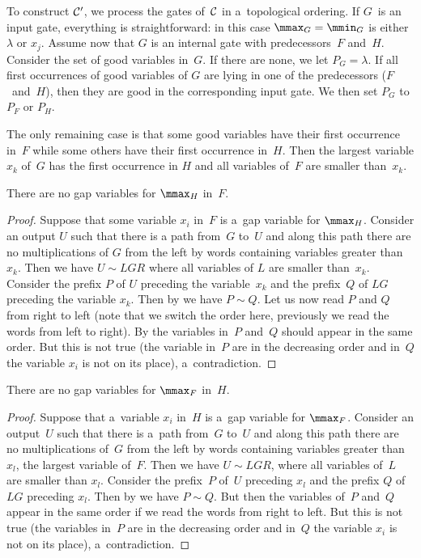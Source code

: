\documentclass{toc}
\begin{document}
To construct ${\cal C}'$, we process the gates of~${\cal C}$ in a~topological ordering. If $G$~is an input gate, everything is straightforward: in this case $\mmax_G=\mmin_G$ is either $\lambda$ or $x_j$. Assume now that $G$ is an internal gate with predecessors~$F$ and~$H$.
Consider the set of good variables in~$G$. If there are none, we let $P_G=\lambda$. If all first occurrences of good variables of $G$ are lying in one of the predecessors ($F$~and~$H$), then they are good in the corresponding input gate. We then set $P_G$ to $P_F$ or $P_H$.

The only remaining case is that some good variables have their first occurrence in~$F$ while some others have their first occurrence in~$H$. Then the largest variable $x_k$ of~$G$ has the first occurrence in $H$ and all variables of~$F$ are smaller than~$x_k$.

\begin{claim} \label{cl: h is good}
    There are no gap variables for $\mmax_H$ in~$F$.
\end{claim}

\begin{proof}
    Suppose that some variable $x_i$ in~$F$ is a~gap variable for $\mmax_H$. Consider an output $U$ such that there is a path from~$G$ to~$U$ and along this path there are no multiplications of $G$ from the left by words containing variables greater than~$x_k$. Then we have $U \sim LGR$ where all variables of $L$ are smaller than~$x_k$. Consider the prefix $P$ of $U$ preceding the variable~$x_k$ and the prefix~$Q$ of $LG$ preceding the variable $x_k$.
    Then by  we have $P \sim Q$. Let us now read $P$ and $Q$ from right to left (note that we switch the order here, previously we read the words from left to right). By  the variables in~$P$ and~$Q$ should appear in the same order. But this is not true (the variable in~$P$ are in the decreasing order and in~$Q$ the variable $x_i$ is not on its place), a~contradiction.
\end{proof}

\begin{claim}\label{cl: f is good}
    There are no gap variables for $\mmax_F$ in~$H$.
\end{claim}

\begin{proof}
    Suppose that a~variable $x_i$ in~$H$ is a~gap variable for $\mmax_F$. Consider an output~$U$ such that there is a~path from~$G$ to~$U$ and along this path there are no multiplications of~$G$ from the left by words containing variables greater than $x_l$, the largest variable of~$F$. Then we have $U \sim LGR$, where all variables of~$L$ are smaller than $x_l$. Consider the prefix~$P$ of~$U$ preceding $x_l$ and the prefix $Q$ of $LG$ preceding $x_l$.
    Then by  we have $P \sim Q$. But then the variables of~$P$ and~$Q$ appear in the same order if we read the words from right to left. But this is not true (the variables in~$P$ are in the decreasing order and in~$Q$ the variable $x_i$ is not on its place), a~contradiction.
\end{proof}
\end{document}
